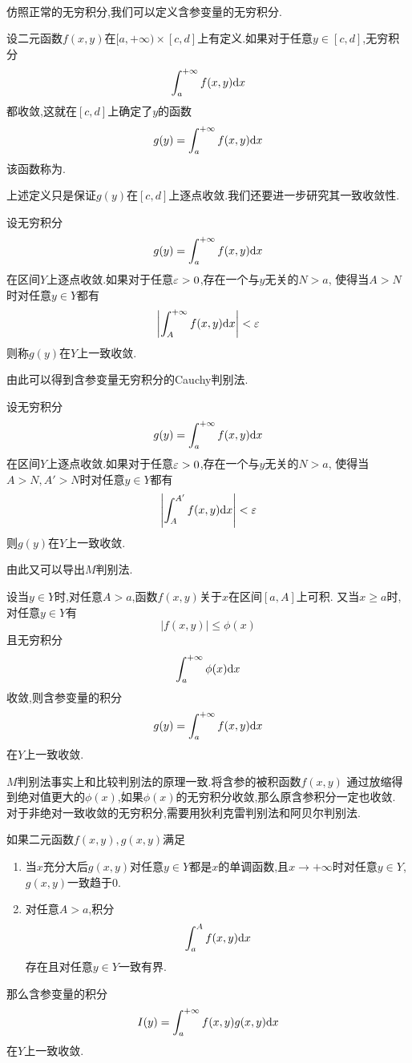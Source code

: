 \documentclass{ctexart}
\begin{document}
\pagestyle{empty}
\begin{center}\large{}\end{center}
\\
\indent 仿照正常的无穷积分,我们可以定义含参变量的无穷积分.
\begin{definition}[1.1 含参变量的无穷积分]
    设二元函数$f(x,y)$在$[a,+\infty)\times[c,d]$上有定义.如果对于任意$y\in[c,d]$,无穷积分
    \[\int_a^{+\infty}f(x,y)\mathrm{d} x\]
    都收敛,这就在$[c,d]$上确定了$y$的函数
    \[g(y)=\int_a^{+\infty}f(x,y)\mathrm{d} x\]
    该函数称为.
\end{definition}
上述定义只是保证$g(y)$在$[c,d]$上逐点收敛.我们还要进一步研究其一致收敛性.
\begin{formal}[1.2 含参变量无穷积分的一致收敛性]
    设无穷积分
    \[g(y)=\int_a^{+\infty}f(x,y)\mathrm{d} x\]
    在区间$Y$上逐点收敛.如果对于任意$\varepsilon>0$,存在一个与$y$无关的$N>a$,%
    使得当$A>N$时对任意$y\in Y$都有
    \[\left|\int_A^{+\infty}f(x,y)\mathrm{d} x\right|<\varepsilon\]
    则称$g(y)$在$Y$上一致收敛.
\end{formal}
由此可以得到含参变量无穷积分的Cauchy判别法.
\begin{formal}[1.3 Cauchy判别法]
    设无穷积分
    \[g(y)=\int_a^{+\infty}f(x,y)\mathrm{d} x\]
    在区间$Y$上逐点收敛.如果对于任意$\varepsilon>0$,存在一个与$y$无关的$N>a$,%
    使得当$A>N,A'>N$时对任意$y\in Y$都有
    \[\left|\int_A^{A'}f(x,y)\mathrm{d} x\right|<\varepsilon\]
    则$g(y)$在$Y$上一致收敛.
\end{formal}
由此又可以导出$M$判别法.
\begin{formal}[1.4 $M$判别法]
    设当$y\in Y$时,对任意$A>a$,函数$f(x,y)$关于$x$在区间$[a,A]$上可积.%
    又当$x\geqslant a$时,对任意$y\in Y$有
    \[\left| f(x,y)\right|\leqslant\phi(x)\]
    且无穷积分
    \[\int_a^{+\infty}\phi(x)\mathrm{d} x\]
    收敛,则含参变量的积分
    \[g(y)=\int_a^{+\infty}f(x,y)\mathrm{d} x\]
    在$Y$上一致收敛.
\end{formal}
$M$判别法事实上和比较判别法的原理一致.将含参的被积函数$f(x,y)$%
通过放缩得到绝对值更大的$\phi(x)$,如果$\phi(x)$的无穷积分收敛,那么原含参积分一定也收敛.\\
\indent 对于非绝对一致收敛的无穷积分,需要用狄利克雷判别法和阿贝尔判别法.
\begin{formal}[1.5 Dirichlet判别法]
    如果二元函数$f(x,y),g(x,y)$满足
    \begin{enumerate}[topsep=0pt,parsep=0pt,itemsep=0pt,partopsep=0pt,leftmargin=*,label=\tbf{(\arabic*)}]
        \item 当$x$充分大后$g(x,y)$对任意$y\in Y$都是$x$的单调函数,且$x\to+\infty$时对任意$y\in Y$,$g(x,y)$一致趋于$0$.
        \item 对任意$A>a$,积分
            \[\int_a^Af(x,y)\mathrm{d} x\]
            存在且对任意$y\in Y$一致有界.
    \end{enumerate}
    那么含参变量的积分
    \[I(y)=\int_a^{+\infty}f(x,y)g(x,y)\mathrm{d} x\]
    在$Y$上一致收敛.
\end{formal}
\end{document}
